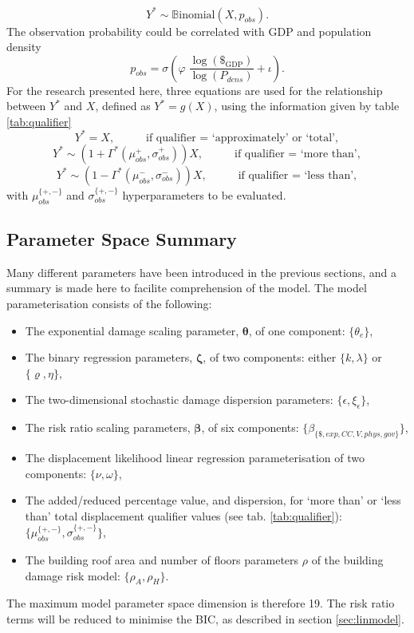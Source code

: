 \documentclass[10pt,a4paper]{article}
\begin{document}
\begin{multicols}{1}
\begin{equation}\label{eq:binomY}
  Y^*\sim\mathbb{B}\text{inomial}(X,p_{obs}).
\end{equation}
The observation probability could be correlated with GDP and population density
\begin{equation}\label{eq:pobs}
  p_{obs}=\sigma\left(\varphi \;\frac{\log(\$_{\text{GDP}})}{\log(P_{dens})}+\iota\right).
\end{equation}
For the research presented here, three equations are used for the relationship between $Y^*$ and $X$, defined as $Y^*=g(X)$, using the information given by table \ref{tab:qualifier}
\begin{equation}\label{eq:YstarT}
  Y^*=X, \;\;\;\;\;\;\;\;\;\; \text{if qualifier = `approximately' or `total'},
\end{equation}
\begin{equation}\label{eq:YstarM}
  Y^*\sim\left(1+\Gamma^*(\mu_{obs}^+,\sigma_{obs}^+)\right)X, \;\;\;\;\;\;\;\;\;\; \text{if qualifier = `more than'},
\end{equation}
\begin{equation}\label{eq:YstarL}  
  Y^*\sim\left(1-\Gamma^*(\mu_{obs}^-,\sigma_{obs}^-)\right)X, \;\;\;\;\;\;\;\;\;\; \text{if qualifier = `less than'},
\end{equation}
with $\mu_{obs}^{\{+,-\}}$ and $\sigma_{obs}^{\{+,-\}}$ hyperparameters to be evaluated.
\subsection{Parameter Space Summary}\label{sec:parameters}
Many different parameters have been introduced in the previous sections, and a summary is made here to facilite comprehension of the model. The model parameterisation consists of the following:
\begin{itemize}
\item The exponential damage scaling parameter, $\boldsymbol{\theta}$, of one component: $\{\theta_{e}\}$,
\item The binary regression parameters, $\boldsymbol{\zeta}$, of two components: either $\{k,\lambda\}$ or $\{\varrho,\eta\}$,
\item The two-dimensional stochastic damage dispersion parameters: $\{\epsilon, \xi_{\epsilon}\}$,
\item The risk ratio scaling parameters, $\boldsymbol{\beta}$, of six components: $\{\beta_{\{\$, exp, CC, V, phys, gov\}}\}$,
\item The displacement likelihood linear regression parameterisation of two components: $\{\nu,\omega\}$,
\item The added/reduced percentage value, and dispersion, for `more than' or `less than' total displacement qualifier values (see tab. \ref{tab:qualifier}): $\{\mu_{obs}^{\{+,-\}},\sigma_{obs}^{\{+,-\}}\}$,
\item The building roof area and number of floors parameters $\rho$ of the building damage risk model: $\{\rho_A,\rho_H\}$.
\end{itemize}
The maximum model parameter space dimension is therefore 19. The risk ratio terms will be reduced to minimise the BIC, as described in section \ref{sec:linmodel}.

\end{multicols}
\end{document}
